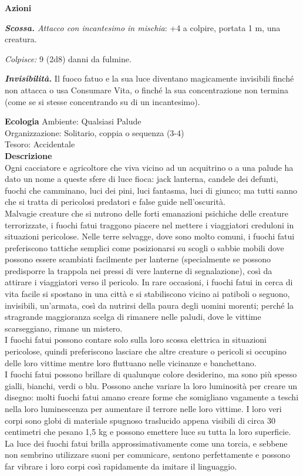 \begin{multicols}{2}
\textbf{Azioni}

\emph{\textbf{Scossa.} Attacco con incantesimo in mischia}: +4 a colpire, portata 1 m, una creatura.

\emph{Colpisce:} 9 (2d8) danni da fulmine.

\emph{\textbf{Invisibilità.}} Il fuoco fatuo e la sua luce diventano magicamente invisibili finché non attacca o usa Consumare Vita, o finché la sua concentrazione non termina (come se si stesse concentrando su di un incantesimo).

\textbf{Ecologia}
Ambiente: Qualsiasi Palude\\
Organizzazione: Solitario, coppia o sequenza (3-4)\\
Tesoro: Accidentale\\
\textbf{Descrizione}\\
Ogni cacciatore e agricoltore che viva vicino ad un acquitrino o a una palude ha dato un nome a queste sfere di luce fioca: jack lanterna, candele dei defunti, fuochi che camminano, luci dei pini, luci fantasma, luci di giunco; ma tutti sanno che si tratta di pericolosi predatori e false guide nell'oscurità.\\

Malvagie creature che si nutrono delle forti emanazioni psichiche delle creature terrorizzate, i fuochi fatui traggono piacere nel mettere i viaggiatori creduloni in situazioni pericolose. Nelle terre selvagge, dove sono molto comuni, i fuochi fatui preferiscono tattiche semplici come posizionarsi su scogli o sabbie mobili dove possono essere scambiati facilmente per lanterne (specialmente se possono predisporre la trappola nei pressi di vere lanterne di segnalazione), così da attirare i viaggiatori verso il pericolo. In rare occasioni, i fuochi fatui in cerca di vita facile si spostano in una città e si stabiliscono vicino ai patiboli o seguono, invisibili, un'armata, così da nutrirsi della paura degli uomini morenti; perché la stragrande maggioranza scelga di rimanere nelle paludi, dove le vittime scarseggiano, rimane un mistero.\\

I fuochi fatui possono contare solo sulla loro scossa elettrica in situazioni pericolose, quindi preferiscono lasciare che altre creature o pericoli si occupino delle loro vittime mentre loro fluttuano nelle vicinanze e banchettano.\\

I fuochi fatui possono brillare di qualunque colore desiderino, ma sono più spesso gialli, bianchi, verdi o blu. Possono anche variare la loro luminosità per creare un disegno: molti fuochi fatui amano creare forme che somigliano vagamente a teschi nella loro luminescenza per aumentare il terrore nelle loro vittime. I loro veri corpi sono globi di materiale spugnoso traslucido appena visibili di circa 30 centimetri che pesano 1,5 kg e possono emettere luce su tutta la loro superficie. La luce dei fuochi fatui brilla approssimativamente come una torcia, e sebbene non sembrino utilizzare suoni per comunicare, sentono perfettamente e possono far vibrare i loro corpi così rapidamente da imitare il linguaggio.\\


\end{multicols}

